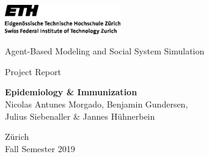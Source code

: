 \thispagestyle{empty}

\begin{center}
\includegraphics[width=5cm]{ETHlogo.eps}

\vspace{1.75\baselineskip}
\LARGE{ Agent-Based Modeling and Social System Simulation\\}

\vspace{0.3\baselineskip}
	
\large{Project Report}\\
\vspace{0.75\baselineskip}

\vfill
\textbf{\LARGE{Epidemiology \& Immunization}}\\
\vspace{1.5\baselineskip}
\large{Nicolas Antunes Morgado, Benjamin Gundersen,\\ Julius Siebenaller \& Jannes H{\"u}hnerbein}
\vfill

Z{\"u}rich\\
Fall Semester 2019\\
\vspace{0.5\baselineskip}
\end{center}
